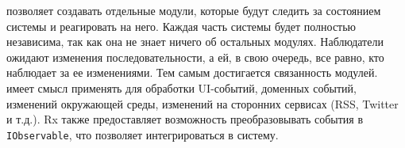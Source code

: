 \rx{} позволяет создавать отдельные модули, которые будут следить за состоянием системы и реагировать на него. Каждая часть системы будет полностью независима, так как она не знает ничего об остальных модулях.
Наблюдатели ожидают изменения последовательности, а ей, в свою очередь, все равно, кто наблюдает за ее изменениями. Тем самым достигается связанность модулей.
\rx{} имеет смысл применять для обработки UI-событий, доменных событий, изменений окружающей среды, изменений на сторонних сервисах (RSS, Twitter и т.д.).
Rx также предоставляет возможность преобразовывать события в \lstinline[style=csharpinlinestyle]!IObservable!, что позволяет интегрироваться в систему.
